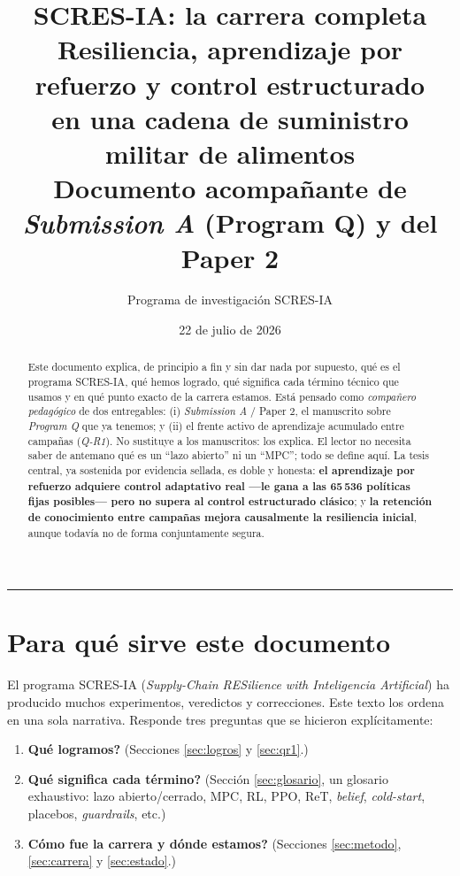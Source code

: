 \documentclass[11pt,a4paper]{article}
\title{\textbf{SCRES-IA: la carrera completa}\\[4pt]
\large Resiliencia, aprendizaje por refuerzo y control estructurado\\
en una cadena de suministro militar de alimentos\\[8pt]
\normalsize Documento acompañante de \emph{Submission A} (Program Q) y del Paper 2}
\author{Programa de investigación SCRES-IA}
\date{22 de julio de 2026}
\begin{document}
\maketitle
\thispagestyle{fancy}

\begin{abstract}
\noindent Este documento explica, de principio a fin y sin dar nada por supuesto, qué es el programa
SCRES-IA, qué hemos logrado, qué significa cada término técnico que usamos y en qué punto exacto de la
carrera estamos. Está pensado como \emph{compañero pedagógico} de dos entregables: (i) \emph{Submission
A} / Paper 2, el manuscrito sobre \emph{Program Q} que ya tenemos; y (ii) el frente activo de
aprendizaje acumulado entre campañas (\emph{Q-R1}). No sustituye a los manuscritos: los explica. El
lector no necesita saber de antemano qué es un ``lazo abierto'' ni un ``MPC''; todo se define aquí. La
tesis central, ya sostenida por evidencia sellada, es doble y honesta: \textbf{el aprendizaje por
refuerzo adquiere control adaptativo real —le gana a las 65\,536 políticas fijas posibles— pero no
supera al control estructurado clásico}; y \textbf{la retención de conocimiento entre campañas mejora
causalmente la resiliencia inicial}, aunque todavía no de forma conjuntamente segura.
\end{abstract}

\tableofcontents
\bigskip
\hrule
\bigskip

\section{Para qué sirve este documento}
El programa SCRES-IA (\emph{Supply-Chain RESilience with Inteligencia Artificial}) ha producido muchos
experimentos, veredictos y correcciones. Este texto los ordena en una sola narrativa. Responde tres
preguntas que se hicieron explícitamente:
\begin{enumerate}[nosep]
  \item \textbf{\textquestiondown{}Qué logramos?} (Secciones \ref{sec:logros} y \ref{sec:qr1}.)
  \item \textbf{\textquestiondown{}Qué significa cada término?} (Sección \ref{sec:glosario}, un glosario exhaustivo:
        lazo abierto/cerrado, MPC, RL, PPO, ReT, \emph{belief}, \emph{cold-start}, placebos,
        \emph{guardrails}, etc.)
  \item \textbf{\textquestiondown{}Cómo fue la carrera y dónde estamos?} (Secciones \ref{sec:metodo}, \ref{sec:carrera}
        y \ref{sec:estado}.)
\end{enumerate}
\end{document}
